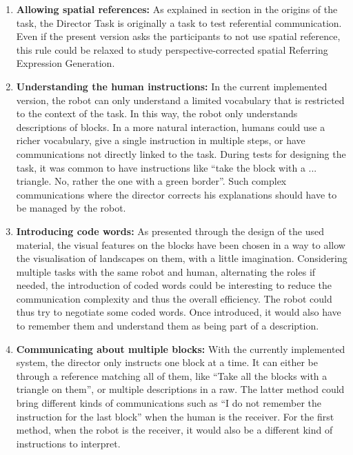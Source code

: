 \begin{enumerate}
\item \textbf{Allowing spatial references:} As explained in section in the origins of the task, the Director Task is originally a task to test referential communication. Even if the present version asks the participants to not use spatial reference, this rule could be relaxed to study perspective-corrected spatial Referring Expression Generation.\label{chal:spatial_ref}

\item \textbf{Understanding the human instructions:} In the current implemented version, the robot can only understand a limited vocabulary that is restricted to the context of the task. In this way, the robot only understands descriptions of blocks. In a more natural interaction, humans could use a richer vocabulary, give a single instruction in multiple steps, or have communications not directly linked to the task. During tests for designing the task, it was common to have instructions like ``take the block with a ... triangle. No, rather the one with a green border''. Such complex communications where the director corrects his explanations should have to be managed by the robot.\label{chal:understand}

\item \textbf{Introducing code words:} As presented through the design of the used material, the visual features on the blocks have been chosen in a way to allow the visualisation of landscapes on them, with a little imagination. Considering multiple tasks with the same robot and human, alternating the roles if needed, the introduction of coded words could be interesting to reduce the communication complexity and thus the overall efficiency. The robot could thus try to negotiate some coded words. Once introduced, it would also have to remember them and understand them as being part of a description. \label{chal:words}

\item \textbf{Communicating about multiple blocks:} With the currently implemented system, the director only instructs one block at a time. It can either be through a reference matching all of them, like ``Take all the blocks with a triangle on them'', or multiple descriptions in a raw. The latter method could bring different kinds of communications such as ``I do not remember the instruction for the last block'' when the human is the receiver. For the first method, when the robot is the receiver, it would also be a different kind of instructions to interpret.\label{chal:multi}
\end{enumerate}

